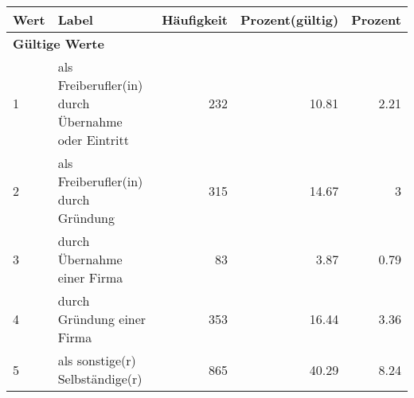      \begin{longtable}{lXrrr}
     \toprule
     \textbf{Wert} & \textbf{Label} & \textbf{Häufigkeit} & \textbf{Prozent(gültig)} & \textbf{Prozent} \\
     \endhead
     \midrule
     \multicolumn{5}{l}{\textbf{Gültige Werte}}\\

     1 &
     \multicolumn{1}{X}{ als Freiberufler(in) durch Übernahme oder Eintritt   } &


       \num{232} &
       \num[round-mode=places,round-precision=2]{10,81} &
         \num[round-mode=places,round-precision=2]{2,21} \\

     2 &
     \multicolumn{1}{X}{ als Freiberufler(in) durch Gründung   } &


       \num{315} &
       \num[round-mode=places,round-precision=2]{14,67} &
         \num[round-mode=places,round-precision=2]{3} \\

     3 &
     \multicolumn{1}{X}{ durch Übernahme einer Firma   } &


       \num{83} &
       \num[round-mode=places,round-precision=2]{3,87} &
         \num[round-mode=places,round-precision=2]{0,79} \\

     4 &
     \multicolumn{1}{X}{ durch Gründung einer Firma   } &


       \num{353} &
       \num[round-mode=places,round-precision=2]{16,44} &
         \num[round-mode=places,round-precision=2]{3,36} \\

     5 &
     \multicolumn{1}{X}{ als sonstige(r) Selbständige(r)   } &


       \num{865} &
       \num[round-mode=places,round-precision=2]{40,29} &
         \num[round-mode=places,round-precision=2]{8,24} \\


\end{longtable}
